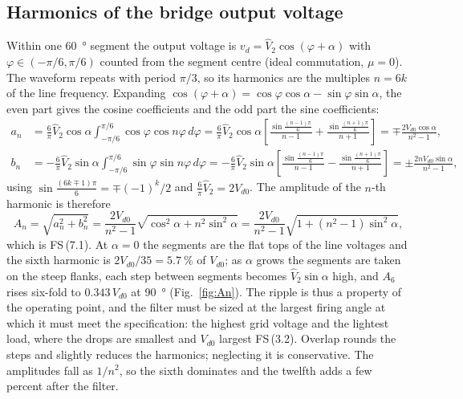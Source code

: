 \documentclass[10pt,a4paper]{scrartcl}
\newcommand{\Vdo}{V_{d0}}
\newcommand{\fs}[1]{\textsf{FS}\,(#1)}
\begin{document}
\subsection{Harmonics of the bridge output voltage}
Within one \SI{60}{\degree} segment the output voltage is $v_d = \hat V_2\cos(\varphi+\alpha)$ with $\varphi\in(-\pi/6,\pi/6)$ counted from the segment centre (ideal commutation, $\mu = 0$). The waveform repeats with period $\pi/3$, so its harmonics are the multiples $n = 6k$ of the line frequency. Expanding $\cos(\varphi+\alpha) = \cos\varphi\cos\alpha - \sin\varphi\sin\alpha$, the even part gives the cosine coefficients and the odd part the sine coefficients:
\begin{align}
a_n &= \frac{6}{\pi}\hat V_2\cos\alpha\int_{-\pi/6}^{\pi/6}\cos\varphi\cos n\varphi\,d\varphi
     = \frac{6}{\pi}\hat V_2\cos\alpha\left[\frac{\sin\frac{(n-1)\pi}{6}}{n-1} + \frac{\sin\frac{(n+1)\pi}{6}}{n+1}\right] = \mp\frac{2\Vdo\cos\alpha}{n^2-1}, \\
b_n &= -\frac{6}{\pi}\hat V_2\sin\alpha\int_{-\pi/6}^{\pi/6}\sin\varphi\sin n\varphi\,d\varphi
     = -\frac{6}{\pi}\hat V_2\sin\alpha\left[\frac{\sin\frac{(n-1)\pi}{6}}{n-1} - \frac{\sin\frac{(n+1)\pi}{6}}{n+1}\right] = \pm\frac{2n\Vdo\sin\alpha}{n^2-1},
\end{align}
using $\sin\frac{(6k\mp1)\pi}{6} = \mp(-1)^k/2$ and $\frac{6}{\pi}\hat V_2 = 2\Vdo$. The amplitude of the $n$-th harmonic is therefore
\begin{equation}
A_n = \sqrt{a_n^2+b_n^2} = \frac{2\Vdo}{n^2-1}\sqrt{\cos^2\alpha + n^2\sin^2\alpha} = \frac{2\Vdo}{n^2-1}\sqrt{1 + (n^2-1)\sin^2\alpha} ,
\label{eq:Anderiv}
\end{equation}
which is \fs{7.1}. At $\alpha = 0$ the segments are the flat tops of the line voltages and the sixth harmonic is $2\Vdo/35 = \SI{5.7}{\percent}$ of $\Vdo$; as $\alpha$ grows the segments are taken on the steep flanks, each step between segments becomes $\hat V_2\sin\alpha$ high, and $A_6$ rises six-fold to $0.343\,\Vdo$ at \SI{90}{\degree} (Fig.~\ref{fig:An}). The ripple is thus a property of the operating point, and the filter must be sized at the largest firing angle at which it must meet the specification: the highest grid voltage and the lightest load, where the drops are smallest and $\Vdo$ largest \fs{3.2}. Overlap rounds the steps and slightly reduces the harmonics; neglecting it is conservative. The amplitudes fall as $1/n^2$, so the sixth dominates and the twelfth adds a few percent after the filter.
\end{document}
